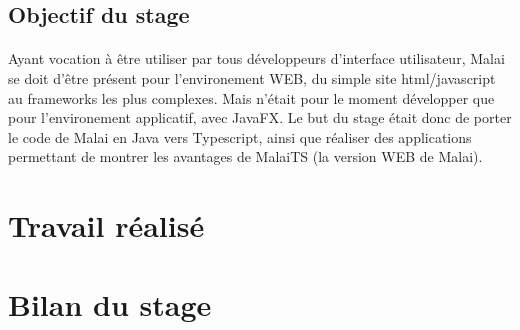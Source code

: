 \documentclass[11pt, a4paper, pdftex]{article}
\begin{document}
        \subsection{Objectif du stage}\label{subsec:objsta}
            \paragraph{}
                Ayant vocation à être utiliser par tous développeurs d'interface utilisateur, Malai se doit d'être présent pour l'environement WEB, du simple site html/javascript au frameworks les plus complexes.
                Mais n'était pour le moment développer que pour l'environement applicatif, avec JavaFX. Le but du stage était donc de porter le code de Malai en Java
                vers Typescript, ainsi que réaliser des applications permettant de montrer les avantages de MalaiTS (la version WEB de Malai).
    \newpage
    \section{Travail réalisé}\label{sec:trarea}
    \newpage
    \section{Bilan du stage}\label{sec:bilsta}
\end{document}
